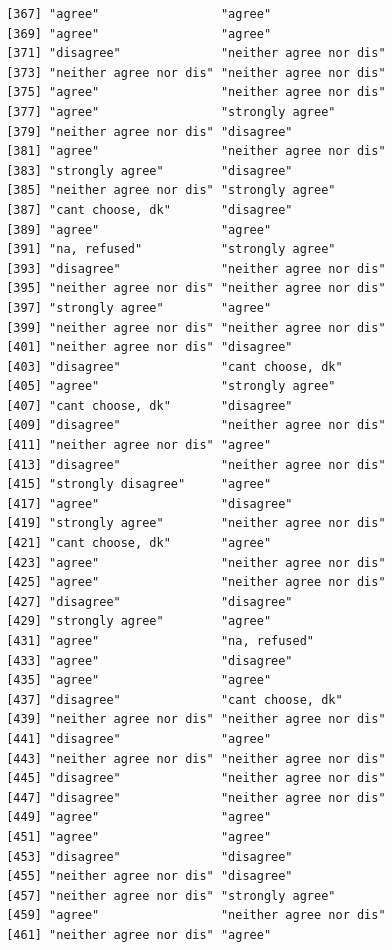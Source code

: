 \documentclass{beamer}\usepackage[]{graphicx}\usepackage[]{color}
\makeatletter
\newenvironment{kframe}{%
 \def\at@end@of@kframe{}%
 \ifinner\ifhmode%
  \def\at@end@of@kframe{\end{minipage}}%
  \begin{minipage}{\columnwidth}%
 \fi\fi%
 \def\FrameCommand##1{\hskip\@totalleftmargin \hskip-\fboxsep
 \colorbox{shadecolor}{##1}\hskip-\fboxsep
     \hskip-\linewidth \hskip-\@totalleftmargin \hskip\columnwidth}%
 \MakeFramed {\advance\hsize-\width
   \@totalleftmargin\z@ \linewidth\hsize
   \@setminipage}}%
 {\par\unskip\endMakeFramed%
 \at@end@of@kframe}
\newenvironment{knitrout}{}{} %
\makeatother
\begin{document}
\begin{frame}[fragile]
\begin{knitrout}
\begin{kframe}
\begin{verbatim}
 [367] "agree"                 "agree"                
 [369] "agree"                 "agree"                
 [371] "disagree"              "neither agree nor dis"
 [373] "neither agree nor dis" "neither agree nor dis"
 [375] "agree"                 "neither agree nor dis"
 [377] "agree"                 "strongly agree"       
 [379] "neither agree nor dis" "disagree"             
 [381] "agree"                 "neither agree nor dis"
 [383] "strongly agree"        "disagree"             
 [385] "neither agree nor dis" "strongly agree"       
 [387] "cant choose, dk"       "disagree"             
 [389] "agree"                 "agree"                
 [391] "na, refused"           "strongly agree"       
 [393] "disagree"              "neither agree nor dis"
 [395] "neither agree nor dis" "neither agree nor dis"
 [397] "strongly agree"        "agree"                
 [399] "neither agree nor dis" "neither agree nor dis"
 [401] "neither agree nor dis" "disagree"             
 [403] "disagree"              "cant choose, dk"      
 [405] "agree"                 "strongly agree"       
 [407] "cant choose, dk"       "disagree"             
 [409] "disagree"              "neither agree nor dis"
 [411] "neither agree nor dis" "agree"                
 [413] "disagree"              "neither agree nor dis"
 [415] "strongly disagree"     "agree"                
 [417] "agree"                 "disagree"             
 [419] "strongly agree"        "neither agree nor dis"
 [421] "cant choose, dk"       "agree"                
 [423] "agree"                 "neither agree nor dis"
 [425] "agree"                 "neither agree nor dis"
 [427] "disagree"              "disagree"             
 [429] "strongly agree"        "agree"                
 [431] "agree"                 "na, refused"          
 [433] "agree"                 "disagree"             
 [435] "agree"                 "agree"                
 [437] "disagree"              "cant choose, dk"      
 [439] "neither agree nor dis" "neither agree nor dis"
 [441] "disagree"              "agree"                
 [443] "neither agree nor dis" "neither agree nor dis"
 [445] "disagree"              "neither agree nor dis"
 [447] "disagree"              "neither agree nor dis"
 [449] "agree"                 "agree"                
 [451] "agree"                 "agree"                
 [453] "disagree"              "disagree"             
 [455] "neither agree nor dis" "disagree"             
 [457] "neither agree nor dis" "strongly agree"       
 [459] "agree"                 "neither agree nor dis"
 [461] "neither agree nor dis" "agree"                

\end{verbatim}
\end{kframe}
\end{knitrout}
\end{frame}
\end{document}
